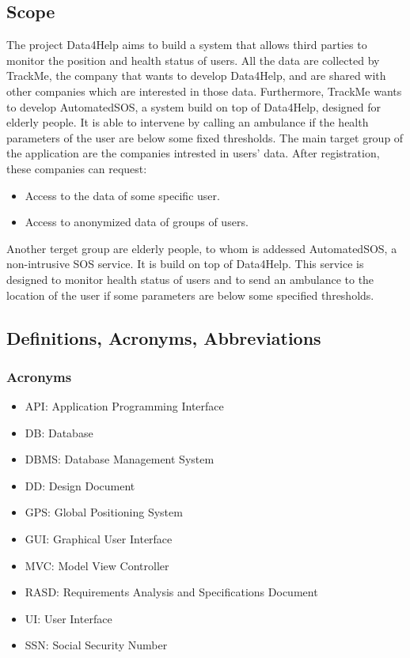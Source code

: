 \documentclass{article}
\begin{document}
\subsection{Scope}
The project Data4Help aims to build a system that allows third parties to monitor the position and health status of users. All the data are collected by TrackMe, the company that wants to develop Data4Help, and are shared with other companies which are interested in those data. Furthermore, TrackMe wants to develop AutomatedSOS, a system build on top of Data4Help, designed for elderly people. It is able to intervene by calling an ambulance if the health parameters of the user are below some fixed thresholds.
The main target group of the application are the companies intrested in users' data.
After registration, these companies can request:
\begin{itemize}
\item Access to the data of some specific user.
\item Access to anonymized data of groups of users.
\end{itemize}
Another terget group are elderly people, to whom is addessed AutomatedSOS, a non-intrusive SOS service. It is build on top of Data4Help. This service is designed to monitor health status of users and to send an ambulance to the location of the user if some parameters are below some specified thresholds.
\subsection{Definitions, Acronyms, Abbreviations}
\subsubsection{Acronyms}
\begin{itemize}
\item API: Application Programming Interface
\item DB: Database
\item DBMS: Database Management System 
\item DD: Design Document
\item GPS: Global Positioning System
\item GUI: Graphical User Interface
\item MVC: Model View Controller
\item RASD: Requirements Analysis and Specifications Document
\item UI: User Interface
\item SSN: Social Security Number
\end{itemize}
\end{document}
